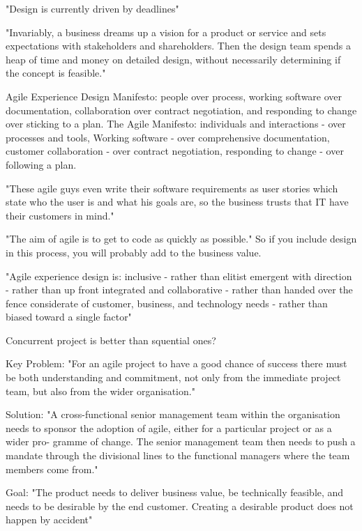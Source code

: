 "Design is currently driven by deadlines" \citep{ratcliffe2011agile:4}

"Invariably, a business dreams up a vision for a product or service and sets expectations with stakeholders and shareholders. Then the design team spends a heap of time and money on detailed design, without necessarily determining if the concept is feasible." \citep{ratcliffe2011agile:6}

Agile Experience Design Manifesto: 
people over process, 
working software over documentation, 
collaboration over contract negotiation, 
and responding to change over sticking to a plan.
The Agile Manifesto: 
individuals and interactions - over processes and tools, 
Working software - over comprehensive documentation, 
customer collaboration - over contract negotiation, 
responding to change - over following a plan.
\citep{theagilemanifesto:online}

"These agile guys even write their software requirements as user stories which state who the user is and what his goals are, so the business trusts that IT have their customers in mind." \citep{ratcliffe2011agile:7}

"The aim of agile is to get to code as quickly as possible." So if you include design in this process, you will probably add to the business value. \citep{ratcliffe2011agile:9}

"Agile experience design is:
inclusive - rather than elitist
emergent with direction - rather than up front
integrated and collaborative - rather than handed over the fence
considerate of customer, business, and technology needs - rather than biased toward a single factor" \citep{ratcliffe2011agile:9}

Concurrent project is better than squential ones?

Key Problem: "For an agile project to have a good chance of success there must be both understanding and commitment, not only from the immediate project team, but also from the wider organisation." \citep{ratcliffe2011agile:11}

Solution: "A cross-functional senior management team within the organisation needs to sponsor the adoption of agile, either for a particular project or as a wider pro- gramme of change. The senior management team then needs to push a mandate through the divisional lines to the functional managers where the team members come from." \citep{ratcliffe2011agile:11}

Goal: "The product needs to deliver business value, be technically feasible, and needs to be desirable by the end customer. Creating a desirable product does not happen by accident" \citep{ratcliffe2011agile:11}

